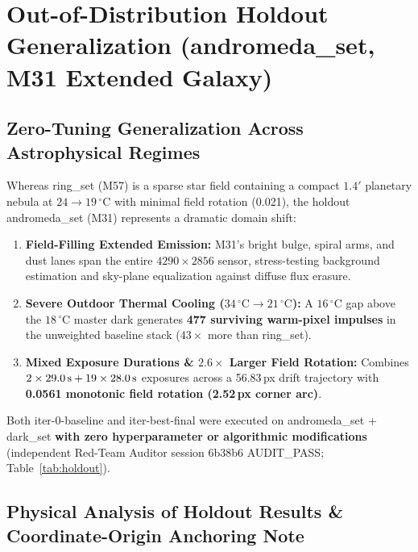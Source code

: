 \documentclass[10pt,twocolumn,letterpaper]{article}
\DeclareRobustCommand{\code}[1]{\texttt{#1}}
\def\code#1{#1}%
\begin{document}
\section{Out-of-Distribution Holdout Generalization (\code{andromeda\_set}, M31 Extended Galaxy)}
\label{sec:holdout}

\subsection{Zero-Tuning Generalization Across Astrophysical Regimes}

Whereas \code{ring\_set} (M57) is a sparse star field containing a compact $1.4'$ planetary nebula at $24 \to 19\,^\circ\text{C}$ with minimal field rotation (\code{0.021\textdegree}), the holdout \code{andromeda\_set} (M31) represents a dramatic domain shift:
\begin{enumerate}
  \item \textbf{Field-Filling Extended Emission:} M31's bright bulge, spiral arms, and dust lanes span the entire $4290 \times 2856$ sensor, stress-testing background estimation and sky-plane equalization against diffuse flux erasure.
  \item \textbf{Severe Outdoor Thermal Cooling ($34\,^\circ\text{C} \to 21\,^\circ\text{C}$):} A $16\,^\circ\text{C}$ gap above the $18\,^\circ\text{C}$ master dark generates \textbf{\code{477} surviving warm-pixel impulses} in the unweighted baseline stack ($43\times$ more than \code{ring\_set}).
  \item \textbf{Mixed Exposure Durations \& $2.6\times$ Larger Field Rotation:} Combines $2 \times 29.0\text{\,s} + 19 \times 28.0\text{\,s}$ exposures across a \code{56.83\,px} drift trajectory with \textbf{\code{0.0561\textdegree} monotonic field rotation (\code{2.52\,px} corner arc)}.
\end{enumerate}

Both \code{iter-0-baseline} and \code{iter-best-final} were executed on \code{andromeda\_set} + \code{dark\_set} \textbf{with zero hyperparameter or algorithmic modifications} (independent Red-Team Auditor session \code{6b38b6} \code{AUDIT\_PASS}; Table~\ref{tab:holdout}).

\subsection{Physical Analysis of Holdout Results \& Coordinate-Origin Anchoring Note}
\end{document}
